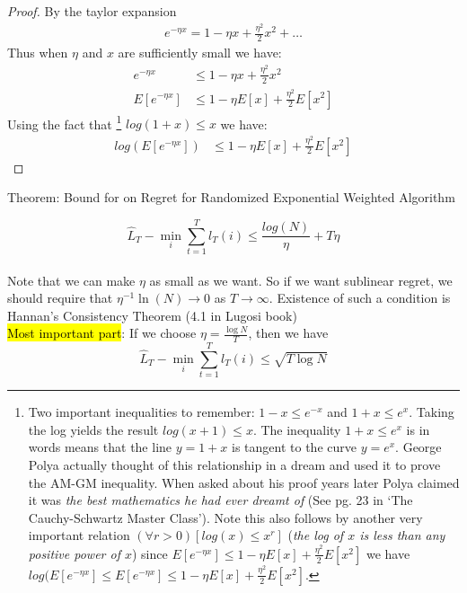 \documentclass[11pt]{article}
\theoremstyle{quest}
\begin{document}
\begin{proof}
By the taylor expansion 
	\begin{align*}
	e^{-\eta x} = 1 - \eta x+\frac{\eta^2}{2}x^2+\dots
	\end{align*}
	Thus when $\eta$ and $x$ are sufficiently small we have:
	\begin{align*}
	e^{-\eta x} &\le 1 - \eta x+\frac{\eta^2}{2}x^2 \\
	E[e^{-\eta x}] &\le 1-\eta E[x]+\frac{\eta^2}{2}E[x^2]
	\end{align*}
	Using the fact that%
	\footnote{Two important inequalities to remember: $1-x\le e^{-x}$ and $1+x\le e^x $. Taking the log yields the result $log(x+1)\le x$. The inequality $1+x\le e^x $ is in words means that the line $y=1+x$ is tangent to the curve $y=e^x$. George Polya actually thought of this relationship in a dream and used it to prove the AM-GM inequality. When asked about his proof years later Polya claimed it was \textit{the best mathematics he had ever dreamt of}  (See pg. 23 in `The Cauchy-Schwartz Master Class'). Note this also follows by another very important relation $(\forall r>0) [log(x)\le x^r]$ (\textit{the log of $x$ is less than any positive power of $x$}) since $E[e^{-\eta x}] \le 1-\eta E[x]+\frac{\eta^2}{2}E[x^2]$ we have $log(E[e^{-\eta x}] \le E[e^{-\eta x}] \le 1-\eta E[x]+\frac{\eta^2}{2}E[x^2]$.  }
	 $log(1+x)\le x$ we have:
	\begin{align*}
	log(E[e^{-\eta x}]) &\le 1-\eta E[x]+\frac{\eta^2}{2}E[x^2]
	\end{align*}
\end{proof}
\begin{tcolorbox}
\begin{center}
Theorem: Bound for on Regret for Randomized Exponential Weighted Algorithm
\end{center}  

\begin{equation} \label{eq:rando_e_bound} \hat{L}_T-\min_{i}\sum_{t=1}^T l_T(i) \le \frac{log(N)}{\eta}+T\eta \end{equation}\\ 
Note that we can make $\eta$ as small as we want. So if we want sublinear regret, we should require that $\eta^{-1}\ln(N)\rightarrow 0$ as $T\rightarrow \infty$. Existence of such a condition is Hannan's Consistency Theorem (4.1 in  Lugosi book)\\
\hl{Most important part}: If we choose $\eta = \frac{\log{N}}{T}$, then we have 
$$\hat{L}_T-\min_{i}\sum_{t=1}^T l_T(i) \le \sqrt{T\log{N}}$$
\end{tcolorbox}
\end{document}
